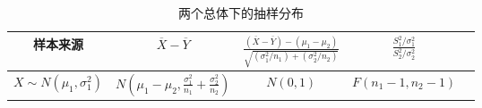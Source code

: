 \begin{table}[ht]
	\centering
	\begin{tabular}{*5c}
		\hline
		样本来源
			& \(\overline{X}-\overline{Y}\)
			& \(\frac{(\overline{X}-\overline{Y})-(\mu_1-\mu_2)}{\sqrt{(\sigma_1^2/n_1)+(\sigma_2^2/n_2)}}\)
			& \(\frac{S_1^2/\sigma_1^2}{S_2^2/\sigma_2^2}\)
			\\
		\hline
		\(X \sim N(\mu_1,\sigma_1^2)\)
			& \(N\left(\mu_1-\mu_2,\frac{\sigma_1^2}{n_1}+\frac{\sigma_2^2}{n_2}\right)\)
			& \(N(0,1)\)
			& \(F(n_1-1,n_2-1)\)
			\\
		\hline
	\end{tabular}
	\caption{两个总体下的抽样分布}
\end{table}
